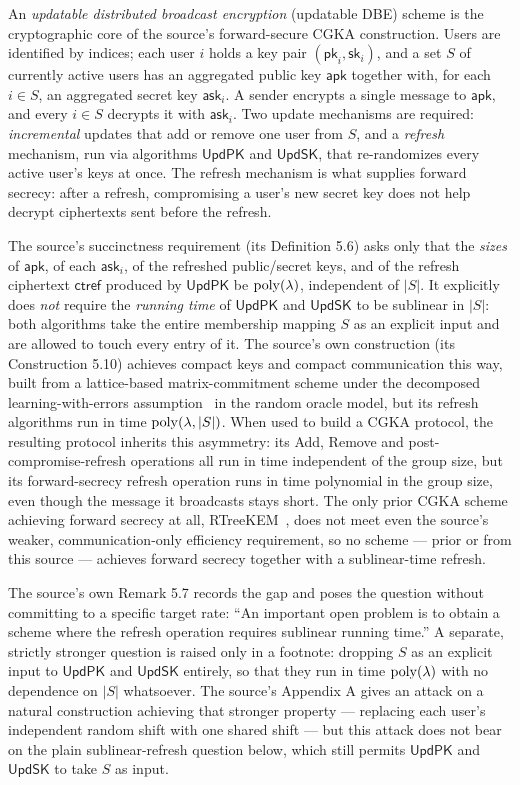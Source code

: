 \documentclass{aicr-conjecture}
\newcommand{\lam}{\lambda}
\newcommand{\UpdPK}{\mathsf{UpdPK}}
\newcommand{\UpdSK}{\mathsf{UpdSK}}
\newcommand{\apk}{\mathsf{apk}}
\newcommand{\ask}{\mathsf{ask}}
\newcommand{\pk}{\mathsf{pk}}
\newcommand{\sk}{\mathsf{sk}}
\newcommand{\ctref}{\mathsf{ctref}}
\begin{document}
An \emph{updatable distributed broadcast encryption} (updatable DBE)
scheme is the cryptographic core of the source's forward-secure CGKA
construction. Users are identified by indices; each user $i$ holds a
key pair $(\pk_{i}, \sk_{i})$, and a set $S$ of currently active users
has an aggregated public key $\apk$ together with, for each $i \in S$,
an aggregated secret key $\ask_{i}$. A sender encrypts a single message
to $\apk$, and every $i \in S$ decrypts it with $\ask_{i}$. Two update
mechanisms are required: \emph{incremental} updates that add or remove
one user from $S$, and a \emph{refresh} mechanism, run via algorithms
$\UpdPK$ and $\UpdSK$, that re-randomizes every active user's keys at
once. The refresh mechanism is what supplies forward secrecy: after a
refresh, compromising a user's new secret key does not help decrypt
ciphertexts sent before the refresh.

The source's succinctness requirement (its Definition 5.6) asks only
that the \emph{sizes} of $\apk$, of each $\ask_{i}$, of the refreshed
public/secret keys, and of the refresh ciphertext $\ctref$ produced by
$\UpdPK$ be $\poly(\lam)$, independent of $|S|$. It explicitly does
\emph{not} require the \emph{running time} of $\UpdPK$ and $\UpdSK$ to
be sublinear in $|S|$: both algorithms take the entire membership
mapping $S$ as an explicit input and are allowed to touch every entry
of it. The source's own construction (its Construction 5.10) achieves
compact keys and compact communication this way, built from a
lattice-based matrix-commitment scheme under the decomposed
learning-with-errors assumption~\cite{AMR25} in the random oracle
model, but its refresh algorithms run in time $\poly(\lam, |S|)$. When
used to build a CGKA protocol, the resulting protocol inherits this
asymmetry: its Add, Remove and post-compromise-refresh operations all
run in time independent of the group size, but its forward-secrecy
refresh operation runs in time polynomial in the group size, even
though the message it broadcasts stays short. The only prior CGKA
scheme achieving forward secrecy at all, RTreeKEM~\cite{ACDT20}, does
not meet even the source's weaker, communication-only efficiency
requirement, so no scheme --- prior or from this source --- achieves
forward secrecy together with a sublinear-time refresh.

The source's own Remark 5.7 records the gap and poses the question
without committing to a specific target rate: ``An important open
problem is to obtain a scheme where the refresh operation requires
sublinear running time.'' A separate, strictly stronger question is
raised only in a footnote: dropping $S$ as an explicit input to
$\UpdPK$ and $\UpdSK$ entirely, so that they run in time $\poly(\lam)$
with no dependence on $|S|$ whatsoever. The source's Appendix A gives
an attack on a natural construction achieving that stronger property
--- replacing each user's independent random shift with one shared
shift --- but this attack does not bear on the plain sublinear-refresh
question below, which still permits $\UpdPK$ and $\UpdSK$ to take $S$
as input.
\end{document}
